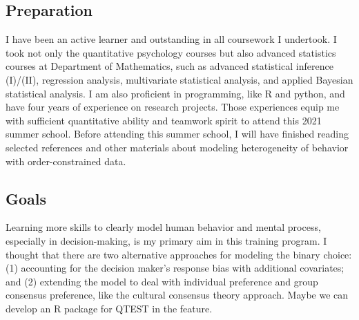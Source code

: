 \documentclass[11pt, a4paper]{awesome-cv}
\begin{document}
\begin{spacing}{1.5}
\begingroup
\fontsize{14pt}{1em}\bodyfontlight\bfseries\color{text}
\hypertarget{preparation}{%
\subsection{Preparation}\label{preparation}}
\endgroup

\begingroup
\fontsize{12pt}{1em}\bodyfontlight\mdseries\color{text}
I have been an active learner and outstanding in all coursework I
undertook. I took not only the quantitative psychology courses but also
advanced statistics courses at Department of Mathematics, such as
advanced statistical inference (I)/(II), regression analysis,
multivariate statistical analysis, and applied Bayesian statistical
analysis. I am also proficient in programming, like R and python, and
have four years of experience on research projects. Those experiences
equip me with sufficient quantitative ability and teamwork spirit to
attend this 2021 summer school. Before attending this summer school, I
will have finished reading selected references and other materials about 
modeling heterogeneity of behavior with order-constrained data. 
\endgroup


\begingroup
\fontsize{14pt}{1em}\bodyfontlight\bfseries\color{text}
\hypertarget{goals}{%
\subsection{Goals}\label{goals}}
\endgroup

\begingroup
\fontsize{12pt}{1em}\bodyfontlight\mdseries\color{text}
Learning more skills to clearly model human behavior and mental process, especially in decision-making, is my primary aim in this training
program. I thought that there are two alternative approaches for
modeling the binary choice: (1) accounting for the decision maker's
response bias with additional covariates; and (2) extending the model to
deal with individual preference and group consensus preference, like the
cultural consensus theory approach. Maybe we can develop an R package for 
QTEST in the feature.
\endgroup

\end{spacing}
\end{document}
